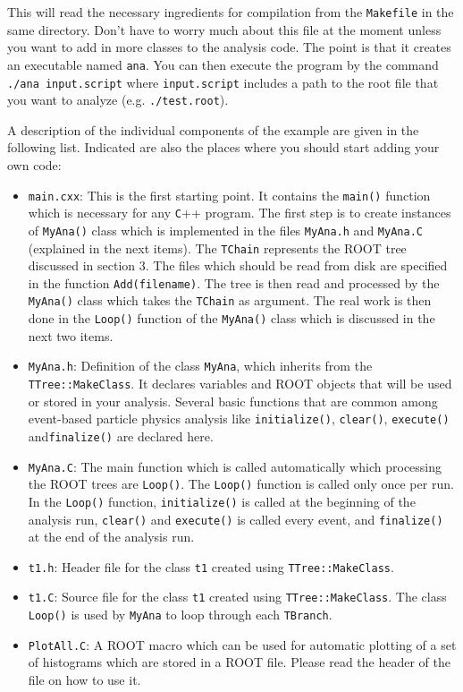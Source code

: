 \documentclass[12pt,letterpaper]{article}
\begin{document}
This will read the necessary ingredients for compilation from the \verb+Makefile+ in the same directory. Don't have to worry much about this file at the moment unless you want to add in more classes to the analysis code.
The point is that it creates an executable named \verb+ana+. You can then execute the program by the command \verb+./ana input.script+ where \verb+input.script+ includes a path to the root file that you want to analyze (e.g. \verb+./test.root+). 

A description of the individual components of the example are given in the following list. Indicated are also the places where you should start adding your own code:

\begin{itemize}
\item  \verb+main.cxx+: This is the first starting point. It contains the \verb+main()+ function which is necessary for any \verb+C+++ program. The first step is to create instances of \verb+MyAna()+ class which is implemented in the files \verb+MyAna.h+ and \verb+MyAna.C+ (explained in the next items). The \verb+TChain+ represents the ROOT tree discussed in section 3. The files which should be read from disk are specified in the function \verb+Add(filename)+. The tree is then read and processed by the \verb+MyAna()+ class which takes the \verb+TChain+ as argument. The real work is then done in the \verb+Loop()+ function of the \verb+MyAna()+ class which is discussed in the next two items. 

\item \verb+MyAna.h+: Definition of the class \verb+MyAna+, which inherits from the \verb+TTree::MakeClass+. It declares variables and ROOT objects that will be used or stored in your analysis. Several basic functions that are common among event-based particle physics analysis like \verb+initialize()+, \verb+clear()+, \verb+execute()+ and\verb+finalize()+ are declared here.
\item \verb+MyAna.C+: The main function which is called automatically which processing the ROOT trees are \verb+Loop()+. The \verb+Loop()+ function is called only once per run. In the \verb+Loop()+ function, \verb+initialize()+ is called at the beginning of the analysis run, \verb+clear()+ and \verb+execute()+ is called every event, and \verb+finalize()+ at the end of the analysis run.

\item \verb+t1.h+: Header file for the class \verb+t1+ created using \verb+TTree::MakeClass+.  

\item \verb+t1.C+: Source file for the class \verb+t1+ created using \verb+TTree::MakeClass+. The class \verb+Loop()+ is used by \verb+MyAna+ to loop through each \verb+TBranch+.

\item \verb+PlotAll.C+: A ROOT macro which can be used for automatic plotting of a set of histograms which are stored in a ROOT file. Please read the header of the file on how to use it. 
\end{itemize}
\end{document}
